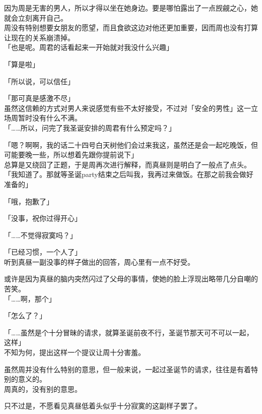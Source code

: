 因为周是无害的男人，所以才得以坐在她身边。要是哪怕露出了一点觊觎之心，她就会立刻离开自己。\\

周没有特别想要女朋友的愿望，而且食欲这边对他还更加重要，因而周也没有打算让现在的关系崩溃掉。\\

「也是呢。周君的话看起来一开始就对我没什么兴趣」

「算是啦」

「所以说，可以信任」

「那可真是感激不尽」\\

虽然这信赖的方式对男人来说感觉有些不太好接受，不过对「安全的男性」这一立场周暂时没有什么不满。\\

「……所以，问完了我圣诞安排的周君有什么预定吗？」

「嗯？啊啊，我的话二十四号白天树他们会过来我这，虽然还是会一起吃晚饭，但可能要晚一些，所以想着先跟你提前说下」\\

总算是又绕回了正题，于是周再次进行解释，而真昼则是明白了一般点了点头。\\

「我知道了。那就等圣诞party结束之后叫我，我再过来做饭。在那之前我会做好准备的」

「哦，抱歉了」

「没事，祝你过得开心」

「……不觉得寂寞吗？」

「已经习惯，一个人了」\\

听到真昼一副没事的样子做出的回答，周心里有一点不好受。

或许是因为真昼的脑内突然闪过了父母的事情，使她的脸上浮现出略带几分自嘲的苦笑。\\

「……啊，那个」

「怎么了？」

「……虽然是个十分冒昧的请求，就算圣诞前夜不行，圣诞节那天可不可以一起，这样」\\

不知为何，提出这样一个提议让周十分害羞。

虽然周并没有什么特别的意思，但一般来说，一起过圣诞节的请求，往往是有着特别的意义的。\\

周真的，没有别的意思。

只不过是，不愿看见真昼低着头似乎十分寂寞的这副样子罢了。\\

